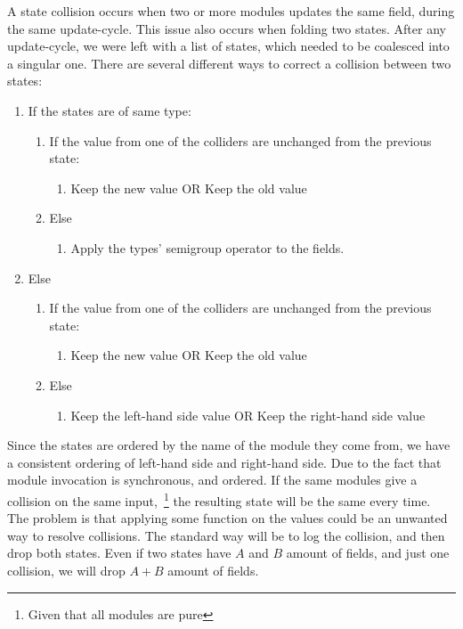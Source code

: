 A state collision occurs when two or more modules updates the same field, during
the same update-cycle. This issue also occurs when folding two states. After any
update-cycle, we were left with a list of states, which needed to be coalesced
into a singular one. There are several different ways to correct a collision
between two states:

\begin{enumerate}
  \item If the states are of same type:
    \begin{enumerate}
      \item If the value from one of the colliders are unchanged from the previous state:
        \begin{enumerate}
          \item Keep the new value OR Keep the old value
        \end{enumerate}
      \item Else
        \begin{enumerate}
          \item Apply the types' semigroup operator to the fields.
        \end{enumerate}
    \end{enumerate}
  \item Else
    \begin{enumerate}
      \item If the value from one of the colliders are unchanged from the previous state:
        \begin{enumerate}
          \item Keep the new value OR Keep the old value
        \end{enumerate}
      \item Else
        \begin{enumerate}
          \item Keep the left-hand side value OR Keep the right-hand side value
        \end{enumerate}
    \end{enumerate}
\end{enumerate}

Since the states are ordered by the name of the module they come from, we
have a consistent ordering of left-hand side and right-hand side. Due to the
fact that module invocation is synchronous, and ordered. If the same modules
give a collision on the same input,~\footnote{Given that all modules are pure} the
resulting state will be the same every time. The problem is that applying some
function on the values could be an unwanted way to resolve collisions. The
standard way will be to log the collision, and then drop both states. Even
if two states have $A$ and $B$ amount of fields, and just one collision, we will
drop $A + B$ amount of fields.

